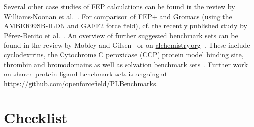 \documentclass[9pt,bestpractices]{livecoms}
\begin{document}
Several other case studies of FEP calculations can be found in the review by Williams-Noonan et al.~\cite{williams-noonan2018free}. For comparison of FEP+ and Gromacs (using the AMBER99SB-ILDN and GAFF2 force field), cf. the recently published study by Pérez-Benito et al.~\cite{perez-benito2019predicting}.
An overview of further suggested benchmark sets can be found in the review by Mobley and Gilson~\cite{mobley2017predicting} or on \url{alchemistry.org}~\cite{alchemistry}. These include cyclodextrins, the Cytochrome C peroxidase (CCP) protein model binding site, thrombin and bromodomains as well as solvation benchmark sets~\cite{paliwal2011benchmark}. Further work on shared protein-ligand benchmark sets is ongoing at \url{https://github.com/openforcefield/PLBenchmarks}.

\section{Checklist}
\label{sec:checklist}


\end{document}
